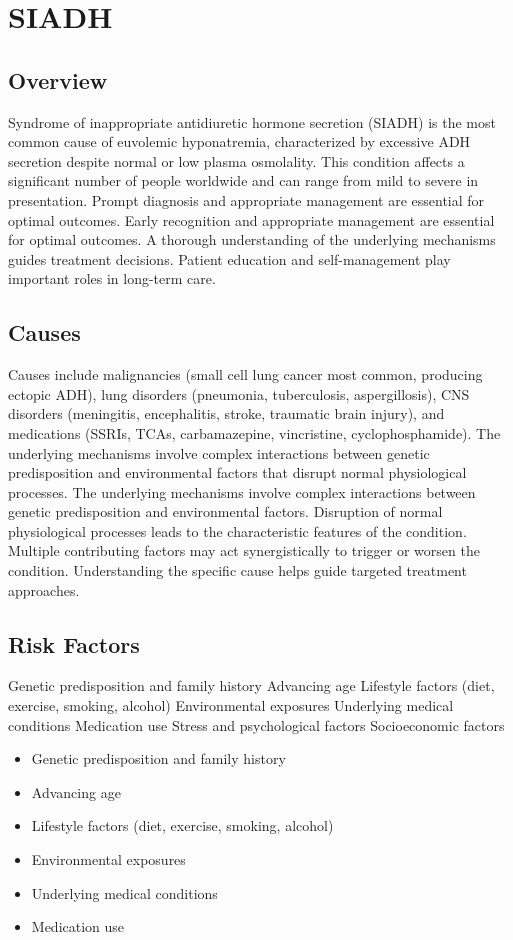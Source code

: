 \chapter{SIADH}
\label{sec:SIADH}

\section{Overview}
Syndrome of inappropriate antidiuretic hormone secretion (SIADH) is the most common cause of euvolemic hyponatremia, characterized by excessive ADH secretion despite normal or low plasma osmolality. This condition affects a significant number of people worldwide and can range from mild to severe in presentation. Prompt diagnosis and appropriate management are essential for optimal outcomes. Early recognition and appropriate management are essential for optimal outcomes. A thorough understanding of the underlying mechanisms guides treatment decisions. Patient education and self-management play important roles in long-term care.
\section{Causes}
Causes include malignancies (small cell lung cancer most common, producing ectopic ADH), lung disorders (pneumonia, tuberculosis, aspergillosis), CNS disorders (meningitis, encephalitis, stroke, traumatic brain injury), and medications (SSRIs, TCAs, carbamazepine, vincristine, cyclophosphamide). The underlying mechanisms involve complex interactions between genetic predisposition and environmental factors that disrupt normal physiological processes. The underlying mechanisms involve complex interactions between genetic predisposition and environmental factors. Disruption of normal physiological processes leads to the characteristic features of the condition. Multiple contributing factors may act synergistically to trigger or worsen the condition. Understanding the specific cause helps guide targeted treatment approaches.
\section{Risk Factors}
Genetic predisposition and family history Advancing age Lifestyle factors (diet, exercise, smoking, alcohol) Environmental exposures Underlying medical conditions Medication use Stress and psychological factors Socioeconomic factors

\begin{itemize}[noitemsep]
  \item Genetic predisposition and family history
  \item Advancing age
  \item Lifestyle factors (diet, exercise, smoking, alcohol)
  \item Environmental exposures
  \item Underlying medical conditions
  \item Medication use
\end{itemize}
